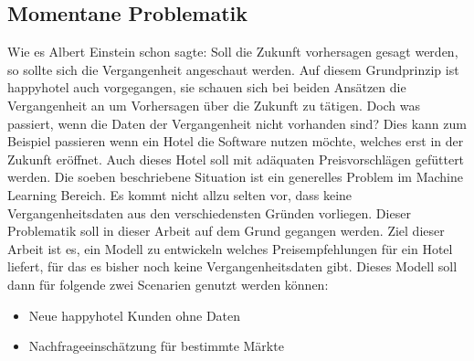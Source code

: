 \subsection{Momentane Problematik}
\label{subsec:problematik}
Wie es Albert Einstein schon sagte: Soll die Zukunft vorhersagen gesagt werden, so sollte sich die Vergangenheit angeschaut werden. Auf diesem Grundprinzip ist happyhotel auch vorgegangen, sie schauen sich bei beiden Ansätzen die Vergangenheit an um Vorhersagen über die Zukunft zu tätigen. 
\newline
\newline
Doch was passiert, wenn die Daten der Vergangenheit nicht vorhanden sind? Dies kann zum Beispiel passieren wenn ein Hotel die Software nutzen möchte, welches erst in der Zukunft eröffnet. Auch dieses Hotel soll mit adäquaten Preisvorschlägen gefüttert werden.
Die soeben beschriebene Situation ist ein generelles Problem im Machine Learning Bereich. Es kommt nicht allzu selten vor, dass keine Vergangenheitsdaten aus den verschiedensten Gründen vorliegen. Dieser Problematik soll in dieser Arbeit auf dem Grund gegangen werden. 
\newline
\newline
Ziel dieser Arbeit ist es,  ein Modell zu entwickeln welches Preisempfehlungen für ein Hotel liefert, für das es bisher noch keine Vergangenheitsdaten gibt. Dieses Modell soll dann für folgende zwei Scenarien genutzt werden können:
\begin{itemize}
    \item Neue happyhotel Kunden ohne Daten
    \item Nachfrageeinschätzung für bestimmte Märkte
\end{itemize}